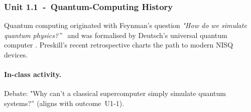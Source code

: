 \subsubsection*{Unit 1.1 - Quantum-Computing History}
Quantum computing originated with Feynman’s question \emph{"How do we simulate quantum physics?”} \cite{Feynman:1986} 
and was formalised by Deutsch’s universal quantum computer \cite{Deutsch:1985}.  
Preskill’s recent retrospective \cite{Preskill:2023} charts the path to modern NISQ devices.

\paragraph{In-class activity.}
Debate: "Why can’t a classical supercomputer simply simulate quantum systems?”  (aligns with outcome~U1-1).







